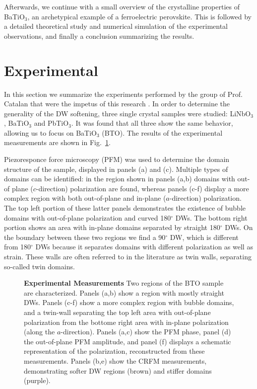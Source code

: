Afterwards, we continue with a small overview of the crystalline properties of BaTiO$_3$, an archetypical example of a ferroelectric perovskite.
This is followed by a detailed theoretical study and numerical simulation of the experimental observations, and finally a conclusion summarizing the results.

\section{Experimental}
In this section we summarize the experiments performed by the group of Prof. Catalan that were the impetus of this research \cite{Stefani2020}.
In order to determine the generality of the DW softening, three single crystal samples were studied: LiNbO$_3$, BaTiO$_3$ and PbTiO$_3$. It was found that all three show the same behavior, allowing us to focus on BaTiO$_3$ (BTO).
The results of the experimental measurements are shown in Fig.~\ref{fig:BTO_experiment}.

Piezoresponce force microscopy (PFM)\cite{Harnagea2001} was used to determine the domain structure of the sample, displayed in panels (a) and (c).
Multiple types of domains can be identified: in the region shown in panels (a,b) domains with out-of plane ($c$-direction) polarization are found, whereas panels (c-f) display a more complex region with both out-of-plane and in-plane ($a$-direction) polarization.
The top left portion of these latter panels demonstrates the existence of bubble domains with out-of-plane polarization and curved 180$^\circ$ DWs.
The bottom right portion shows an area with in-plane domains separated by straight 180$^\circ$ DWs.
On the boundary between these two regions we find a 90$^\circ$ DW, which is different from 180$^\circ$ DWs because it separates domains with different polarization as well as strain.
These walls are often referred to in the literature as twin walls, separating so-called twin domains. 

\begin{figure}
	\caption{\label{fig:BTO_experiment} {\bf Experimental Measurements} Two regions of the BTO sample are characterized. Panels (a,b) show a region with mostly straight DWs. Panels (c-f) show a more complex region with bubble domains, and a twin-wall separating the top left area with out-of-plane polarization from the bottome right area with in-plane polarization (along the $a$-direction). Panels (a,c) show the PFM phase, panel (d) the out-of-plane PFM amplitude, and panel (f) displays a schematic representation of the polarization, reconstructed from these measurements. Panels (b,e) show the CRFM measurements, demonstrating softer DW regions (brown) and stiffer domains (purple).}
\end{figure}

